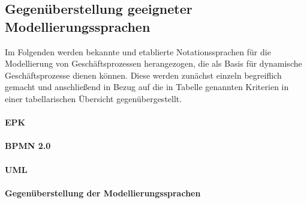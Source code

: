 \subsection{Gegenüberstellung geeigneter Modellierungssprachen}
Im Folgenden werden bekannte und etablierte Notationssprachen für die Modellierung von Geschäftsprozessen herangezogen, die als Basis für dynamische Geschäftsprozesse dienen können. Diese werden zunächst einzeln begreiflich gemacht und anschließend in Bezug auf die in Tabelle  genannten Kriterien in einer tabellarischen Übersicht gegenübergestellt.

\paragraph{EPK}

\paragraph{BPMN 2.0}

\paragraph{UML}

\paragraph{Gegenüberstellung der Modellierungssprachen}

